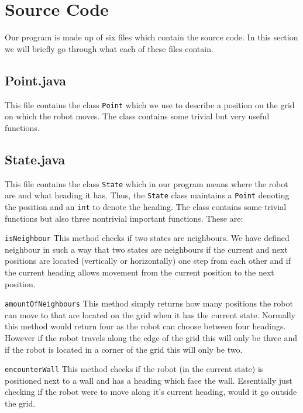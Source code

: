 \documentclass[a4paper]{article}
\begin{document}
\section{Source Code}
Our program is made up of six files which contain the source code. In this section we will briefly go through what each of these files contain.

\subsection{Point.java}
This file contains the class \texttt{Point} which we use to describe a position on the grid on which the robot moves. The class contains some trivial but very useful functions.
\subsection{State.java}
This file contains the class \texttt{State} which in our program means where the robot are and what heading it has. Thus, the \texttt{State} class maintains a \texttt{Point} denoting the position and an \texttt{int} to denote the heading. The class contains some trivial functions but also three nontrivial important functions. These are:
\begin{description}
\item{\texttt{isNeighbour}} This method checks if two states are neighbours. We have defined neighbour in such a way that two states are neighbours if the current and next positions are located (vertically or horizontally) one step from each other and if the current heading allows movement from the current position to the next position.
\item{\texttt{amountOfNeighbours}} This method simply returns how many positions the robot can move to that are located on the grid when it has the current state. Normally this method would return four as the robot can choose between four headings. However if the robot travels along the edge of the grid this will only be three and if the robot is located in a corner of the grid this will only be two.
\item{\texttt{encounterWall}} This method checks if the robot (in the current state) is positioned next to a wall and has a heading which face the wall. Essentially just checking if the robot were to move along it's current heading, would it go outside the grid.
\end{description}
\end{document}
